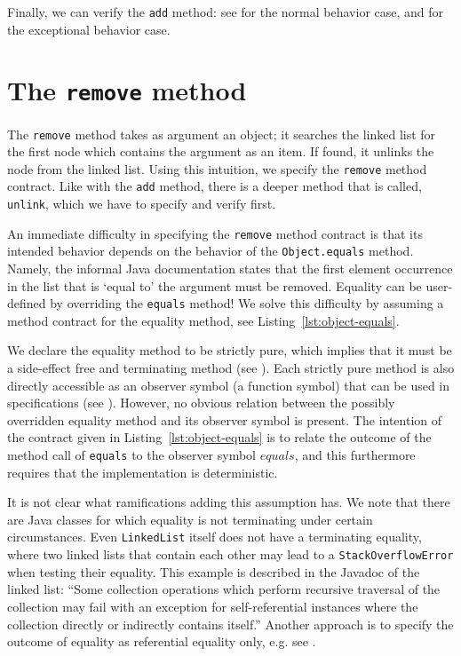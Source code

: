 \documentclass[runningheads]{llncs}
\theoremstyle{remark}
\begin{document}
Finally, we can verify the \texttt{add} method: see  for the normal behavior case, and  for the exceptional behavior case.

\section{The \texttt{remove} method}\label{sec:remove}

The \texttt{remove} method takes as argument an object; it searches the linked list for the first node which contains the argument as an item. If found, it unlinks the node from the linked list. Using this intuition, we specify the \texttt{remove} method contract. Like with the \texttt{add} method, there is a deeper method that is called, \texttt{unlink}, which we have to specify and verify first.

An immediate difficulty in specifying the \texttt{remove} method contract is that its intended behavior depends on the behavior of the \texttt{Object.equals} method. Namely, the informal Java documentation states that the first element occurrence in the list that is `equal to' the argument must be removed. Equality can be user-defined by overriding the \texttt{equals} method! We solve this difficulty by assuming a method contract for the equality method, see Listing~\ref{lst:object-equals}.



We declare the equality method to be strictly pure, which implies that it must be a side-effect free and terminating method (see \cite[Section 7.3.5]{KeYbook}). Each strictly pure method is also directly accessible as an observer symbol (a function symbol) that can be used in specifications (see \cite[Section 8.1.2]{KeYbook}). However, no obvious relation between the possibly overridden equality method and its observer symbol is present. The intention of the contract given in Listing~\ref{lst:object-equals} is to relate the outcome of the method call of \texttt{equals} to the observer symbol $\mathit{equals}$, and this furthermore requires that the implementation is deterministic.

It is not clear what ramifications adding this assumption has. We note that there are Java classes for which equality is not terminating under certain circumstances. Even \texttt{LinkedList} itself does not have a terminating equality, where two linked lists that contain each other may lead to a \texttt{StackOverflowError} when testing their equality. This example is described in the Javadoc \cite{javadoc8collection} of the linked list: ``Some collection operations which perform recursive traversal of the collection may fail with an exception for self-referential instances where the collection directly or indirectly contains itself.'' Another approach is to specify the outcome of equality as referential equality only, e.g. see \cite[Section 4.4]{huisman2002verification}.
\end{document}
